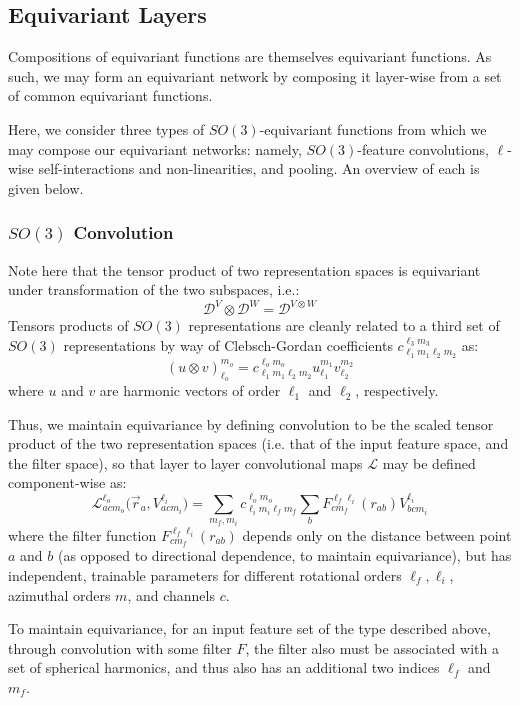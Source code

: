 \documentclass[10pt,a4paper]{article}
\begin{document}
\subsection{Equivariant Layers}
Compositions of equivariant functions are themselves equivariant functions. As such, we may form an equivariant network by composing it layer-wise from a set of common equivariant functions.

Here, we consider three types of $SO(3)$-equivariant functions from which we may compose our equivariant networks: namely, $SO(3)$-feature convolutions, $\ell$-wise self-interactions and non-linearities, and pooling. An overview of each is given below.

\subsubsection{$SO(3)$ Convolution}
Note here that the tensor product of two representation spaces is equivariant under transformation of the two subspaces, i.e.:
$$
\mathcal{D}^V\otimes \mathcal{D}^W=\mathcal{D}^{V\otimes W}
$$
Tensors products of $SO(3)$ representations are cleanly related to a third set of $SO(3)$ representations by way of Clebsch-Gordan coefficients $c^{\ell_3m_3}_{\ell_1m_1\ell_2m_2}$ as:
$$
(u\otimes v)_{\ell_o}^{m_o} = c_{\ell_1m_1\ell_2m_2}^{\ell_om_o}u_{\ell_1}^{m_1}v_{\ell_2}^{m_2}
$$
where $u$ and $v$ are harmonic vectors of order $\ell_1$ and $\ell_2$, respectively.

Thus, we maintain equivariance by defining convolution to be the scaled tensor product of the two representation spaces (i.e. that of the input feature space, and the filter space), so that layer to layer convolutional maps $\mathcal{L}$ may be defined component-wise as:
$$
\mathcal{L}^{\ell_o}_{acm_o}\big(\vec{r}_a,V_{acm_i}^{\ell_i}\big) = \sum_{m_f,m_i}c_{\ell_im_i\ell_fm_f}^{\ell_o m_o}\sum_{b}F^{\ell_f\ell_i}_{cm_f}(r_{ab})V_{bcm_i}^{\ell_i}
$$
where the filter function $F^{\ell_f\ell_i}_{cm_f}(r_{ab})$ depends only on the distance between point $a$ and $b$ (as opposed to directional dependence, to maintain equivariance), but has independent, trainable parameters for different rotational orders $\ell_f, \ell_i$, azimuthal orders $m$, and channels $c$.

To maintain equivariance, for an input feature set of the type described above,  through convolution with some filter $F$,  the filter also must be associated with a set of spherical harmonics, and thus also has an additional two indices $\ell_f$ and $m_f$. 
\end{document}
